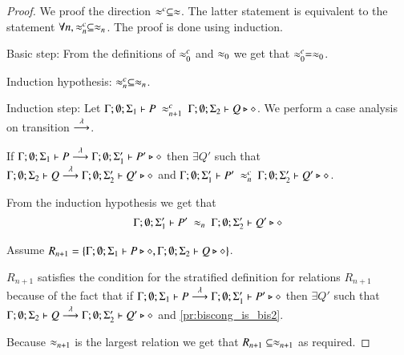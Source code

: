 \begin{proof}
	We proof the direction $\approx^{c} \subseteq \approx$.
	The latter statement is equivalent to the statement $\forall n, \approx^{c}_n \subseteq \approx_n$.
	The proof is done using induction.

	Basic step: From the definitions of $\approx^{c}_0$ and $\approx_0$ we get that $\approx^{c}_0 = \approx_0$.

	Induction hypothesis: $\approx^{c}_n \subseteq \approx_n$.

	Induction step: Let $\Gamma; \emptyset; \Sigma_1 \vdash P\ \approx^{c}_{n+1}\ \Gamma; \emptyset; \Sigma_2 \vdash Q \triangleright \diamond$.
	We perform a case analysis on transition $\stackrel{\lambda}{\longrightarrow}$.


	If $\Gamma; \emptyset; \Sigma_1 \vdash P \stackrel{\lambda}{\longrightarrow} \Gamma; \emptyset; \Sigma_1' \vdash P' \triangleright \diamond$ then
	$\exists Q'$ such that
	$\Gamma; \emptyset; \Sigma_2 \vdash Q \stackrel{\lambda}{\longrightarrow} \Gamma; \emptyset; \Sigma_2' \vdash Q' \triangleright \diamond$
	and
	$\Gamma; \emptyset; \Sigma_1' \vdash P'\ \approx^{c}_n\ \Gamma; \emptyset; \Sigma_2' \vdash Q' \triangleright \diamond$.

	From the induction hypothesis we get that
	\begin{eqnarray}
		\Gamma; \emptyset; \Sigma_1' \vdash P'\ \approx_n\ \Gamma; \emptyset; \Sigma_2' \vdash Q' \triangleright \diamond \label{pr:biscong_is_bis2}
	\end{eqnarray}

	Assume $R_{n+1} = \{\Gamma; \emptyset; \Sigma_1 \vdash P \triangleright \diamond, \Gamma; \emptyset; \Sigma_2 \vdash Q \triangleright \diamond\}$.

	$R_{n+1}$ satisfies the condition for the stratified definition for relations $R_{n+1}$ because of the fact that
	if $\Gamma; \emptyset; \Sigma_1 \vdash P \stackrel{\lambda}{\longrightarrow} \Gamma; \emptyset; \Sigma_1' \vdash P' \triangleright \diamond$ then
	$\exists Q'$ such that
	$\Gamma; \emptyset; \Sigma_2 \vdash Q \stackrel{\lambda}{\longrightarrow} \Gamma; \emptyset; \Sigma_2' \vdash Q' \triangleright \diamond$
	and \ref{pr:biscong_is_bis2}.

	Because $\approx_{n+1}$ is the largest relation we get that $R_{n+1} \subseteq \approx_{n+1}$ as required.



\end{proof}
